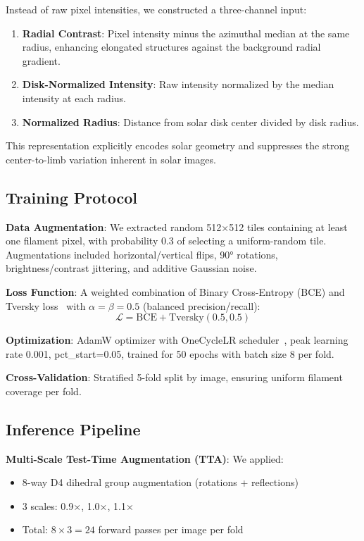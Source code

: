 \documentclass[conference]{IEEEtran}
\begin{document}
Instead of raw pixel intensities, we constructed a three-channel input:
\begin{enumerate}
    \item \textbf{Radial Contrast}: Pixel intensity minus the azimuthal median at the same radius, enhancing elongated structures against the background radial gradient.
    \item \textbf{Disk-Normalized Intensity}: Raw intensity normalized by the median intensity at each radius.
    \item \textbf{Normalized Radius}: Distance from solar disk center divided by disk radius.
\end{enumerate}

This representation explicitly encodes solar geometry and suppresses the strong center-to-limb variation inherent in solar images.

\subsection{Training Protocol}

\textbf{Data Augmentation}: We extracted random 512×512 tiles containing at least one filament pixel, with probability 0.3 of selecting a uniform-random tile. Augmentations included horizontal/vertical flips, 90° rotations, brightness/contrast jittering, and additive Gaussian noise.

\textbf{Loss Function}: A weighted combination of Binary Cross-Entropy (BCE) and Tversky loss~\cite{salehi2017tversky} with $\alpha = \beta = 0.5$ (balanced precision/recall):
\begin{equation}
\mathcal{L} = \text{BCE} + \text{Tversky}(0.5, 0.5)
\end{equation}

\textbf{Optimization}: AdamW optimizer with OneCycleLR scheduler~\cite{smith2019super}, peak learning rate 0.001, pct\_start=0.05, trained for 50 epochs with batch size 8 per fold.

\textbf{Cross-Validation}: Stratified 5-fold split by image, ensuring uniform filament coverage per fold.

\subsection{Inference Pipeline}

\textbf{Multi-Scale Test-Time Augmentation (TTA)}: We applied:
\begin{itemize}
    \item 8-way D4 dihedral group augmentation (rotations + reflections)
    \item 3 scales: 0.9×, 1.0×, 1.1×
    \item Total: $8 \times 3 = 24$ forward passes per image per fold
\end{itemize}
\end{document}

